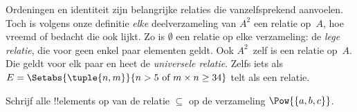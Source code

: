 \documentclass[../../../include/open-logic-section]{subfiles}
\begin{document}
\begin{explain}
Ordeningen en identiteit zijn belangrijke relaties die vanzelfsprekend
aanvoelen. Toch is volgens onze definitie \emph{elke} deelverzameling
van $A^{2}$ een relatie op~$A$, hoe vreemd of bedacht die ook lijkt. Zo
is $\emptyset$ een relatie op elke verzameling: de \emph{lege relatie},
die voor geen enkel paar elementen geldt. Ook $A^{2}$~zelf is een
relatie op~$A$. Die geldt voor elk paar en heet de \emph{universele
relatie}. Zelfs iets als
$E=\Setabs{\tuple{n, m}}{n>5 \text{ of } m \times n \ge 34}$ telt als
een relatie.
\end{explain}
  
\begin{prob}
  Schrijf alle !!{element}s op van de relatie $\subseteq$ op de verzameling
  $\Pow{\{a, b, c\}}$.
\end{prob}
\end{document}
